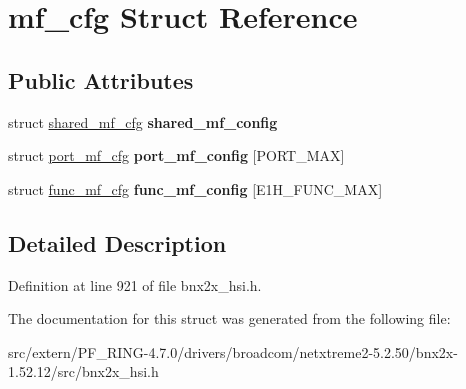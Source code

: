\hypertarget{structmf__cfg}{
\section{mf\_\-cfg Struct Reference}
\label{structmf__cfg}
}
\subsection*{Public Attributes}
\begin{DoxyCompactItemize}
\item 
\hypertarget{structmf__cfg_a13fdd7a0d1f180e76958043106699cb9}{
struct \hyperlink{structshared__mf__cfg}{shared\_\-mf\_\-cfg} {\bfseries shared\_\-mf\_\-config}}
\label{structmf__cfg_a13fdd7a0d1f180e76958043106699cb9}

\item 
\hypertarget{structmf__cfg_a611b0238dc53d7a0c10c315375ab2dbe}{
struct \hyperlink{structport__mf__cfg}{port\_\-mf\_\-cfg} {\bfseries port\_\-mf\_\-config} \mbox{[}PORT\_\-MAX\mbox{]}}
\label{structmf__cfg_a611b0238dc53d7a0c10c315375ab2dbe}

\item 
\hypertarget{structmf__cfg_a05dacda32cde161943a613e1e9cb2349}{
struct \hyperlink{structfunc__mf__cfg}{func\_\-mf\_\-cfg} {\bfseries func\_\-mf\_\-config} \mbox{[}E1H\_\-FUNC\_\-MAX\mbox{]}}
\label{structmf__cfg_a05dacda32cde161943a613e1e9cb2349}

\end{DoxyCompactItemize}


\subsection{Detailed Description}


Definition at line 921 of file bnx2x\_\-hsi.h.



The documentation for this struct was generated from the following file:\begin{DoxyCompactItemize}
\item 
src/extern/PF\_\-RING-\/4.7.0/drivers/broadcom/netxtreme2-\/5.2.50/bnx2x-\/1.52.12/src/bnx2x\_\-hsi.h\end{DoxyCompactItemize}
